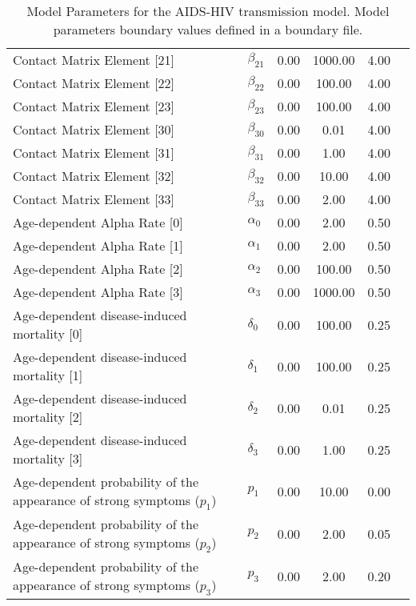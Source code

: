 \begin{table}
\begin{tabular}{p{5cm}lcccc}
Contact Matrix Element [21] & $\beta_{21}$ & 0.00 & 1000.00 & 4.00\\
Contact Matrix Element [22] & $\beta_{22}$ & 0.00 & 100.00 & 4.00\\
Contact Matrix Element [23] & $\beta_{23}$ & 0.00 & 100.00 & 4.00\\
Contact Matrix Element [30] & $\beta_{30}$ & 0.00 & 0.01 & 4.00\\
Contact Matrix Element [31] & $\beta_{31}$ & 0.00 & 1.00 & 4.00\\
Contact Matrix Element [32] & $\beta_{32}$ & 0.00 & 10.00 & 4.00\\
Contact Matrix Element [33] & $\beta_{33}$ & 0.00 & 2.00 & 4.00\\
Age-dependent Alpha Rate [0] & $\alpha_0$ & 0.00 & 2.00 & 0.50\\
Age-dependent Alpha Rate [1] & $\alpha_1$ & 0.00 & 2.00 & 0.50\\
Age-dependent Alpha Rate [2] & $\alpha_2$ & 0.00 & 100.00 & 0.50\\
Age-dependent Alpha Rate [3] & $\alpha_3$ & 0.00 & 1000.00 & 0.50\\
Age-dependent disease-induced mortality [0] & $\delta_0$ & 0.00 & 100.00 & 0.25\\
Age-dependent disease-induced mortality [1] & $\delta_1$ & 0.00 & 100.00 & 0.25\\
Age-dependent disease-induced mortality [2] & $\delta_2$ & 0.00 & 0.01 & 0.25\\
Age-dependent disease-induced mortality [3] & $\delta_3$ & 0.00 & 1.00 & 0.25\\
Age-dependent probability of the appearance of strong symptoms ($p_1$) & $p_1$ & 0.00 & 10.00 & 0.00\\
Age-dependent probability of the appearance of strong symptoms ($p_2$) & $p_2$ & 0.00 & 2.00 & 0.05\\
Age-dependent probability of the appearance of strong symptoms ($p_3$) & $p_3$ & 0.00 & 2.00 & 0.20\\
\hline\hline
\end{tabular}
\caption{Model Parameters for the AIDS-HIV transmission model. Model parameters boundary values defined in a boundary file.}
\end{table}
